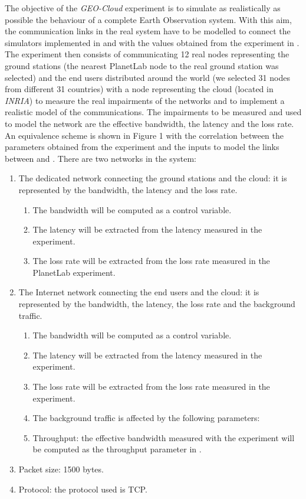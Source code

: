 The objective of the \emph{GEO-Cloud} experiment is to simulate as realistically as possible the behaviour of a complete Earth Observation system. With this aim, the communication links in the real system have to be modelled to connect the simulators implemented in \vw and \bonfire with the values obtained from the experiment in \pl. The experiment then consists of communicating 12 real nodes representing the ground stations (the nearest PlanetLab node to the real ground station was selected) and the end users distributed around the world (we selected 31 nodes from different 31 countries) with a node representing the cloud (located in \emph{INRIA}) to measure the real impairments of the networks and to implement a realistic model of the communications. The impairments to be measured and used to model the network are the effective bandwidth, the latency and the loss rate.
An equivalence scheme is shown in Figure 1 with the correlation between the
parameters obtained from the experiment and the inputs to model the links
between \vw and \bonfire.  There are two networks in the system: 
\begin{enumerate}
\item The dedicated network connecting the ground stations and the cloud: it
  is represented by the bandwidth, the latency and the loss rate. 
\begin{enumerate}
\item The bandwidth will be computed as a control variable.
\item The latency will be extracted from the latency measured in the \pl experiment.
\item The loss rate will be extracted from the loss rate measured in the PlanetLab experiment.
 \end{enumerate}
\item	The Internet network connecting the end users and the cloud: it is
  represented by the bandwidth, the latency, the loss rate and the background
  traffic.
\begin{enumerate}
\item The bandwidth will be computed as a control variable.
\item The latency will be extracted from the latency measured in the \pl experiment.
\item The loss rate will be extracted from the loss rate measured in the \pl experiment.
\item The background traffic is affected by the following parameters:
\item Throughput: the effective bandwidth measured with the \pl
experiment will be computed as the throughput parameter in \vw.
\end{enumerate}

\item Packet size: 1500 bytes.
\item Protocol: the protocol used is TCP.
\end{enumerate}

